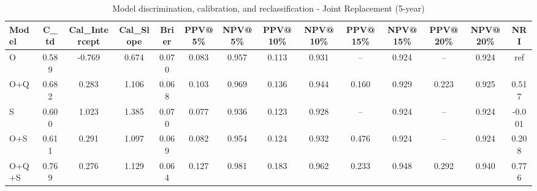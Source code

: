 \begin{table}[htbp]
\centering
\small
\caption{Model discrimination, calibration, and reclassification - Joint Replacement (5-year)}
\label{tab:perf_joint_5y}
\begin{tabular}{lccccccccccccc}
\toprule
Model & C\_td & Cal\_Intercept & Cal\_Slope & Brier & PPV@5\% & NPV@5\% & PPV@10\% & NPV@10\% & PPV@15\% & NPV@15\% & PPV@20\% & NPV@20\% & NRI \\
\midrule
O & 0.589 & -0.769 & 0.674 & 0.070 & 0.083 & 0.957 & 0.113 & 0.931 & -- & 0.924 & -- & 0.924 & ref \\
O+Q & 0.682 & 0.283 & 1.106 & 0.068 & 0.103 & 0.969 & 0.136 & 0.944 & 0.160 & 0.929 & 0.223 & 0.925 & 0.517 \\
S & 0.600 & 1.023 & 1.385 & 0.070 & 0.077 & 0.936 & 0.123 & 0.928 & -- & 0.924 & -- & 0.924 & -0.001 \\
O+S & 0.611 & 0.291 & 1.097 & 0.069 & 0.082 & 0.954 & 0.124 & 0.932 & 0.476 & 0.924 & -- & 0.924 & 0.208 \\
O+Q+S & 0.769 & 0.276 & 1.129 & 0.064 & 0.127 & 0.981 & 0.183 & 0.962 & 0.233 & 0.948 & 0.292 & 0.940 & 0.776 \\
\bottomrule
\end{tabular}
\end{table}